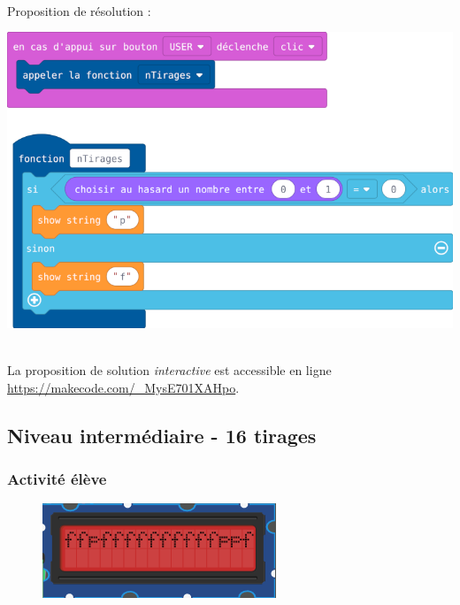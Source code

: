 \begin{minipage}[t]{0.5\linewidth}
    \begin{methode}~\\
        Proposition de résolution :\\
        \centerline{\includegraphics[width=\linewidth]{res/st-pf-01-prof.png}}
    \end{methode}
\end{minipage}
\hfill
\begin{minipage}[t]{0.5\linewidth}
    \begin{remarque}~\\
        La proposition de solution \emph{interactive} est accessible en ligne \url{https://makecode.com/_MysE701XAHpo}.
    \end{remarque}
\end{minipage}

%
%
\newpage
\subsection{Niveau intermédiaire - 16 tirages}
\subsubsection{Activité élève}



%
%
\begin{figure}
    \includegraphics[width=\linewidth]{res/st-pf-02.png}
\end{figure}

